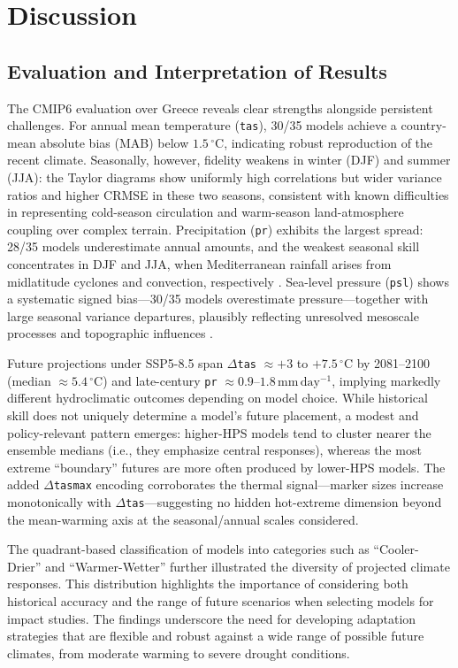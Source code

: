 \documentclass[pdflatex,sn-chicago]{sn-jnl}%
\theoremstyle{thmstyleone}%
\theoremstyle{thmstyletwo}%
\theoremstyle{thmstylethree}%
\begin{document}
\section{Discussion}\label{sec4}
\subsection{Evaluation and Interpretation of Results}

The CMIP6 evaluation over Greece reveals clear strengths alongside persistent challenges. For annual mean temperature (\texttt{tas}), 30/35 models achieve a country-mean absolute bias (MAB) below $1.5\,^{\circ}\mathrm{C}$, indicating robust reproduction of the recent climate. Seasonally, however, fidelity weakens in winter (DJF) and summer (JJA): the Taylor diagrams show uniformly high correlations but wider variance ratios and higher CRMSE in these two seasons, consistent with known difficulties in representing cold-season circulation and warm-season land-atmosphere coupling over complex terrain. Precipitation (\texttt{pr}) exhibits the largest spread: 28/35 models underestimate annual amounts, and the weakest seasonal skill concentrates in DJF and JJA, when Mediterranean rainfall arises from midlatitude cyclones and convection, respectively \citep{Lionello2012, Coppola2020}. Sea-level pressure (\texttt{psl}) shows a systematic signed bias---30/35 models overestimate pressure---together with large seasonal variance departures, plausibly reflecting unresolved mesoscale processes and topographic influences \citep{Katopodis2021, Arjdal2023}.

Future projections under SSP5-8.5 span \(\Delta\)\texttt{tas} \(\approx +3\) to \(+7.5\,^{\circ}\mathrm{C}\) by 2081--2100 (median \(\approx 5.4\,^{\circ}\mathrm{C}\)) and late-century \texttt{pr} \(\approx 0.9\)--\(1.8\,\mathrm{mm\,day^{-1}}\), implying markedly different hydroclimatic outcomes depending on model choice. While historical skill does not uniquely determine a model’s future placement, a modest and policy-relevant pattern emerges: higher-HPS models tend to cluster nearer the ensemble medians (i.e., they emphasize central responses), whereas the most extreme ``boundary'' futures are more often produced by lower-HPS models. The added \(\Delta\)\texttt{tasmax} encoding corroborates the thermal signal---marker sizes increase monotonically with \(\Delta\)\texttt{tas}---suggesting no hidden hot-extreme dimension beyond the mean-warming axis at the seasonal/annual scales considered. 

The quadrant-based classification of models into categories such as ``Cooler-Drier'' and ``Warmer-Wetter'' further illustrated the diversity of projected climate responses. This distribution highlights the importance of considering both historical accuracy and the range of future scenarios when selecting models for impact studies. The findings underscore the need for developing adaptation strategies that are flexible and robust against a wide range of possible future climates, from moderate warming to severe drought conditions.
\end{document}
